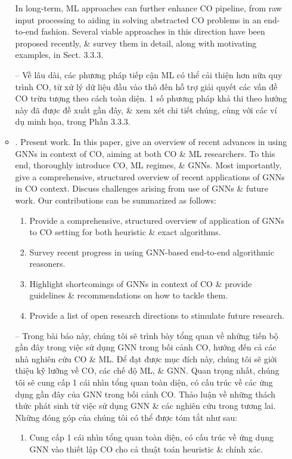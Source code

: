 \documentclass{article}
\begin{document}
\begin{itemize}
\begin{itemize}
        In long-term, ML approaches can further enhance CO pipeline, from raw input processing to aiding in solving abstracted CO problems in an end-to-end fashion. Several viable approaches in this direction have been proposed recently, \& survey them in detail, along with motivating examples, in Sect. 3.3.3.

        -- Về lâu dài, các phương pháp tiếp cận ML có thể cải thiện hơn nữa quy trình CO, từ xử lý dữ liệu đầu vào thô đến hỗ trợ giải quyết các vấn đề CO trừu tượng theo cách toàn diện. 1 số phương pháp khả thi theo hướng này đã được đề xuất gần đây, \& xem xét chi tiết chúng, cùng với các ví dụ minh họa, trong Phần 3.3.3.
        \item {. Present work.} In this paper, give an overview of recent advances in using GNNs in context of CO, aiming at both CO \& ML researchers. To this end, thoroughly introduce CO, ML regimes, \& GNNs. Most importantly, give a comprehensive, structured overview of recent applications of GNNs in CO context. Discuss challenges arising from use of GNNs \& future work. Our contributions can be summarized as follows:
        \begin{enumerate}
            \item Provide a comprehensive, structured overview of application of GNNs to CO setting for both heuristic \& exact algorithms.
            \item Survey recent progress in using GNN-based end-to-end algorithmic reasoners.
            \item Highlight shortcomings of GNNs in context of CO \& provide guidelines \& recommendations on how to tackle them.
            \item Provide a list of open research directions to stimulate future research.
        \end{enumerate}
        -- Trong bài báo này, chúng tôi sẽ trình bày tổng quan về những tiến bộ gần đây trong việc sử dụng GNN trong bối cảnh CO, hướng đến cả các nhà nghiên cứu CO \& ML. Để đạt được mục đích này, chúng tôi sẽ giới thiệu kỹ lưỡng về CO, các chế độ ML, \& GNN. Quan trọng nhất, chúng tôi sẽ cung cấp 1 cái nhìn tổng quan toàn diện, có cấu trúc về các ứng dụng gần đây của GNN trong bối cảnh CO. Thảo luận về những thách thức phát sinh từ việc sử dụng GNN \& các nghiên cứu trong tương lai. Những đóng góp của chúng tôi có thể được tóm tắt như sau:
        \begin{enumerate}
            \item Cung cấp 1 cái nhìn tổng quan toàn diện, có cấu trúc về ứng dụng GNN vào thiết lập CO cho cả thuật toán heuristic \& chính xác.

\end{enumerate}
\end{itemize}
\end{itemize}
\end{document}
